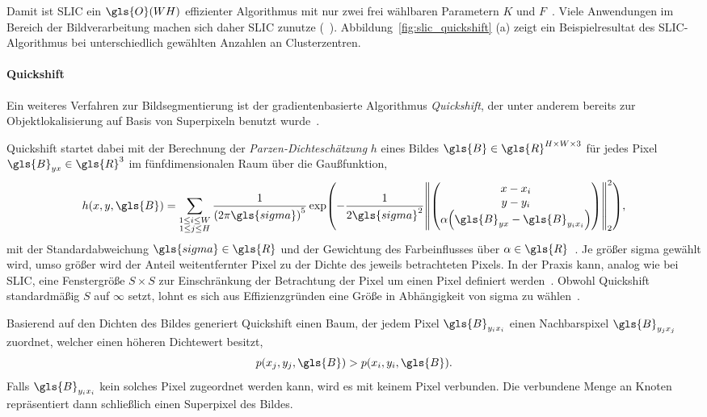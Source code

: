 Damit ist \gls{SLIC} ein $\gls{O}\left(WH\right)$ effizienter Algorithmus mit nur zwei frei wählbaren Parametern $K$ und $F$~\cite{slic}.
Viele Anwendungen im Bereich der Bildverarbeitung machen sich daher \gls{SLIC} zunutze (\vgl{}~\cite{Gadde, supercnn, super}).
Abbildung~\ref{fig:slic_quickshift} (a) zeigt ein Beispielresultat des \gls{SLIC}-Algorithmus bei unterschiedlich gewählten Anzahlen an Clusterzentren.



\paragraph{Quickshift}
\label{quickshift}

Ein weiteres Verfahren zur Bildsegmentierung ist der gradientenbasierte Algorithmus \emph{Quickshift}, der unter anderem bereits zur Objektlokalisierung auf Basis von Superpixeln benutzt wurde~\cite{quickshift,Fulkerson}.

Quickshift startet dabei mit der Berechnung der \emph{Parzen-Dichteschätzung} $h$ eines Bildes $\gls{B} \in \gls{R}^{H \times W \times 3}$ für jedes Pixel $\gls{B}_{yx} \in \gls{R}^3$ im fünfdimensionalen Raum über die Gaußfunktion, \dhe{}
\begin{equation*}
  h\left(x,y, \gls{B}\right) = \sum_{\substack{1 \leq i \leq W\\1 \leq j \leq H}}
  \frac{1}{{\left(2\pi\gls{sigma}\right)}^5} \exp\left(-\frac{1}{2\gls{sigma}^2}{\left\|\begin{pmatrix}
    x - x_i\\
    y - y_i\\
    \alpha \left(\gls{B}_{yx} - \gls{B}_{y_i x_i}\right)
  \end{pmatrix}\right\|}_2^2\right),
\end{equation*}
mit der Standardabweichung $\gls{sigma} \in \gls{R}$ und der Gewichtung des Farbeinflusses über $\alpha \in \gls{R}$~\cite{quickshift}.
Je größer \gls{sigma} gewählt wird, umso größer wird der Anteil weitentfernter Pixel zu der Dichte des jeweils betrachteten Pixels.
In der Praxis kann, analog wie bei \gls{SLIC}, eine Fenstergröße $S \times S$ zur Einschränkung der Betrachtung der Pixel um einen Pixel definiert werden~\cite{super}.
Obwohl Quickshift standardmäßig $S$ auf $\infty$ setzt, lohnt es sich aus Effizienzgründen eine Größe in Abhängigkeit von \gls{sigma} zu wählen~\cite{quickshift}.

Basierend auf den Dichten des Bildes generiert Quickshift einen Baum, der jedem Pixel $\gls{B}_{y_i x_i}$ einen Nachbarspixel $\gls{B}_{y_j x_j}$ zuordnet, welcher einen höheren Dichtewert besitzt, \dhe{}
\begin{equation*}
  p\left(x_j, y_j, \gls{B}\right) > p\left(x_i, y_i, \gls{B}\right).
\end{equation*}
Falls $\gls{B}_{y_i x_i}$ kein solches Pixel zugeordnet werden kann, wird es mit keinem Pixel verbunden.
Die verbundene Menge an Knoten repräsentiert dann schließlich einen Superpixel des Bildes.

